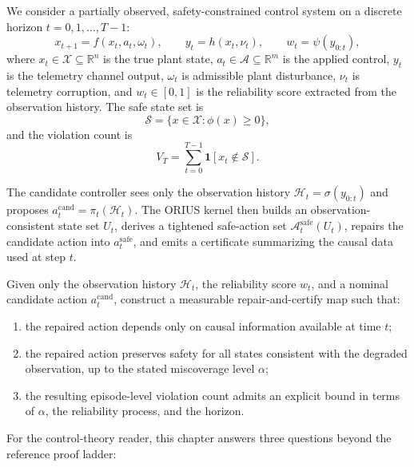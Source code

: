 We consider a partially observed, safety-constrained control system on a
discrete horizon $t = 0,1,\dots,T-1$:
\[
  x_{t+1} = f(x_t, a_t, \omega_t),
  \qquad
  y_t = h(x_t, \nu_t),
  \qquad
  w_t = \psi(y_{0:t}),
\]
where $x_t \in \mathcal{X} \subseteq \mathbb{R}^n$ is the true plant state,
$a_t \in \mathcal{A} \subseteq \mathbb{R}^m$ is the applied control,
$y_t$ is the telemetry channel output, $\omega_t$ is admissible plant
disturbance, $\nu_t$ is telemetry corruption, and $w_t \in [0,1]$ is the
reliability score extracted from the observation history.  The safe state set
is
\[
  \mathcal{S} = \{x \in \mathcal{X} : \phi(x) \ge 0\},
\]
and the violation count is
\[
  V_T = \sum_{t=0}^{T-1} \mathbf{1}[x_t \notin \mathcal{S}].
\]

The candidate controller sees only the observation history
$\mathcal{H}_t = \sigma(y_{0:t})$ and proposes
$a_t^{\mathrm{cand}} = \pi_t(\mathcal{H}_t)$.  The ORIUS kernel then builds
an observation-consistent state set $U_t$, derives a tightened safe-action
set $\mathcal{A}_t^{\mathrm{safe}}(U_t)$, repairs the candidate action into
$a_t^{\mathrm{safe}}$, and emits a certificate summarizing the causal data
used at step $t$.

\begin{definition}
\label{def:degraded-observation-safe-control}
Given only the observation history $\mathcal{H}_t$, the reliability score
$w_t$, and a nominal candidate action $a_t^{\mathrm{cand}}$, construct a
measurable repair-and-certify map such that:
\begin{enumerate}
  \item the repaired action depends only on causal information available at
    time $t$;
  \item the repaired action preserves safety for all states consistent with
    the degraded observation, up to the stated miscoverage level $\alpha$;
  \item the resulting episode-level violation count admits an explicit bound
    in terms of $\alpha$, the reliability process, and the horizon.
\end{enumerate}
\end{definition}

For the control-theory reader, this chapter answers three questions beyond the
reference proof ladder:


